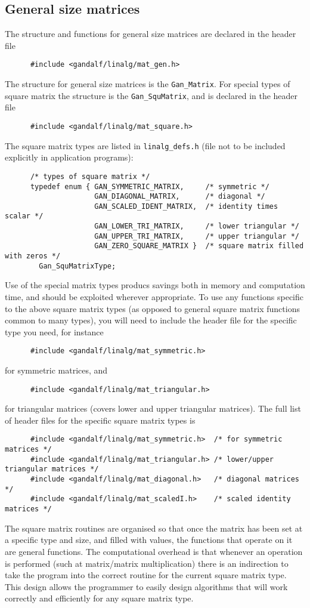 \subsection{General size matrices} \label{general-size-mat-sec}
The structure and functions for general size matrices are declared in the
header file
\begin{verbatim}
      #include <gandalf/linalg/mat_gen.h>
\end{verbatim}
The structure for general size matrices is the {\tt Gan\_Matrix}.
For special types of square matrix the structure is the {\tt Gan\_SquMatrix},
and is declared in the header file
\begin{verbatim}
      #include <gandalf/linalg/mat_square.h>
\end{verbatim}
The square matrix types are listed in {\tt linalg\_defs.h} (file not to be
included explicitly in application programs):
\begin{verbatim}
      /* types of square matrix */
      typedef enum { GAN_SYMMETRIC_MATRIX,     /* symmetric */
                     GAN_DIAGONAL_MATRIX,      /* diagonal */
                     GAN_SCALED_IDENT_MATRIX,  /* identity times scalar */
                     GAN_LOWER_TRI_MATRIX,     /* lower triangular */
                     GAN_UPPER_TRI_MATRIX,     /* upper triangular */
                     GAN_ZERO_SQUARE_MATRIX }  /* square matrix filled with zeros */
        Gan_SquMatrixType;
\end{verbatim}
Use of the special matrix types producs savings both in memory and computation
time, and should be exploited wherever appropriate.
To use any functions specific to the above square matrix types
(as opposed to general square matrix functions common to many types), you will
need to include the header file for the specific type you need, for instance
\begin{verbatim}
      #include <gandalf/linalg/mat_symmetric.h>
\end{verbatim}
for symmetric matrices, and
\begin{verbatim}
      #include <gandalf/linalg/mat_triangular.h>
\end{verbatim}
for triangular matrices (covers lower and upper triangular matrices).
The full list of header files for the specific square matrix types is
\begin{verbatim}
      #include <gandalf/linalg/mat_symmetric.h>  /* for symmetric matrices */
      #include <gandalf/linalg/mat_triangular.h> /* lower/upper triangular matrices */
      #include <gandalf/linalg/mat_diagonal.h>   /* diagonal matrices */
      #include <gandalf/linalg/mat_scaledI.h>    /* scaled identity matrices */
\end{verbatim}
The square matrix routines are organised so that once the matrix has been
set at a specific type and size, and filled with values, the functions that
operate on it are general functions. The computational overhead is that
whenever an operation is performed (such at matrix/matrix multiplication)
there is an indirection to take the program into the correct routine for
the current square matrix type. This design allows the programmer to easily
design algorithms that will work correctly and efficiently
for any square matrix type.

